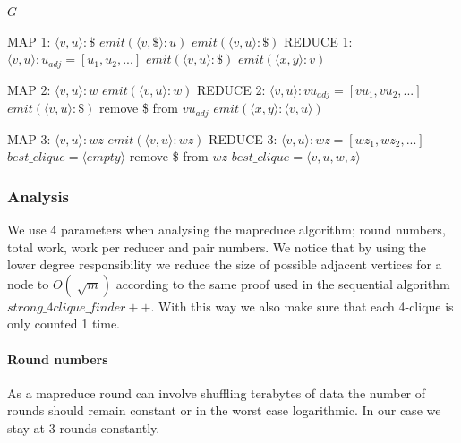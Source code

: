 \documentclass{article}
\begin{document}
\begin{algorithm}
\label{mrAlgorithm}
\caption{$mr\_strong\_4clique\_finder$}
\begin{algorithmic}
\REQUIRE $G$
	
\REQUIRE MAP 1: $\langle v,u\rangle :\$$
		\STATE $emit(\langle v,\$\rangle :u)$
		\STATE $emit(\langle v,u\rangle :\$)$
	\ENDIF
\REQUIRE REDUCE 1: $\langle v,u\rangle :u_{adj} = [u_1,u_2,...]$
		\STATE $emit(\langle v,u\rangle :\$)$
	\ENDIF
				\STATE $emit(\langle x,y\rangle :v)$
			\ENDIF
		\ENDFOR
	\ENDFOR

\REQUIRE MAP 2: $\langle v,u\rangle :w$
	\STATE $emit(\langle v,u\rangle :w)$
\REQUIRE REDUCE 2: $\langle v,u\rangle : vu_{adj} = [vu_1,vu_2,...]$
		\STATE $emit(\langle v,u\rangle : \$)$
		\STATE remove \$ from $vu_{adj}$
	\ENDIF
				\STATE $emit(\langle x,y\rangle :\langle v,u\rangle)$
			\ENDIF
		\ENDFOR
	\ENDFOR

\REQUIRE MAP 3: $\langle v,u\rangle :wz$
	\STATE $emit(\langle v,u\rangle :wz)$
\REQUIRE REDUCE 3: $\langle v,u\rangle :wz = [wz_1,wz_2,...]$
	\STATE $best\_clique = \langle empty\rangle $
	\STATE remove \$ from $wz$
				\STATE $best\_clique = \langle v,u,w,z\rangle$
			\ENDIF
		\ENDFOR
	\ENDIF
\end{algorithmic}
\end{algorithm}

\subsubsection{Analysis}
We use 4 parameters when analysing the mapreduce algorithm; round numbers, total work, work per reducer and pair numbers. We notice that by using the lower degree responsibility we reduce the size of possible adjacent vertices for a node to $O(\sqrt[]{m})$ according to the same proof \cite{AlgorithmicAspects} used in the sequential algorithm $strong\_4clique\_finder++$. With this way we also make sure that each 4-clique is only counted 1 time.

\paragraph{Round numbers}
As a mapreduce round can involve shuffling terabytes of data the number of rounds should remain constant or in the worst case logarithmic. In our case we stay at 3 rounds constantly.
\end{document}
